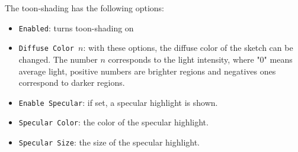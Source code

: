 The toon-shading has the following options:
\begin{itemize}
\item \texttt{Enabled}: turns toon-shading on
\item \texttt{Diffuse Color $n$}: with these options, the diffuse color of the sketch can be changed. The number $n$ corresponds to the light intensity, where "0" means average light, positive numbers are brighter regions and negatives ones correspond to darker regions.
\item \texttt{Enable Specular}: if set, a specular highlight is shown.
\item \texttt{Specular Color}: the color of the specular highlight.
\item \texttt{Specular Size}: the size of the specular highlight.
\end{itemize}

